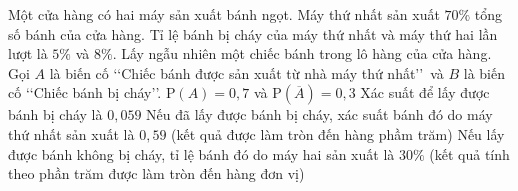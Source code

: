 \begin{ex}%
	Một cửa hàng có  hai máy sản xuất bánh ngọt. Máy thứ nhất sản xuất $70\%$ tổng số bánh của cửa hàng. Tỉ lệ bánh bị cháy của máy thứ nhất và máy thứ hai lần lượt là $5\%$ và $8\%$. Lấy ngẫu nhiên một chiếc bánh trong lô hàng của cửa hàng. Gọi $A$ là biến cố \lq\lq Chiếc bánh được sản xuất từ nhà máy thứ nhất\rq\rq\, và $B$ là biến cố \lq\lq Chiếc bánh bị cháy\rq\rq.
	\choiceTF 
		{\True  $\mathrm{P}(A)=0{,}7$ và $\mathrm{P}\left(\overline{A}\right)=0{,}3$}
		{\True Xác suất để lấy được bánh  bị cháy là $0{,}059$}
		{\True Nếu đã lấy được bánh bị cháy, xác suất bánh đó do máy thứ nhất  sản xuất là $0{,}59$ (kết quả được làm tròn đến hàng phầm trăm)}
		{Nếu lấy được bánh không bị cháy, tỉ lệ bánh  đó do máy hai sản xuất là $30\%$ (kết quả tính theo phần trăm được làm tròn đến hàng đơn vị)}
\end{ex}


